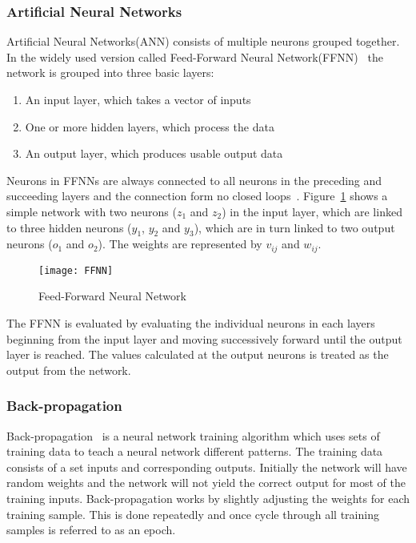 \subsubsection{Artificial Neural Networks}
Artificial Neural Networks(ANN) consists of multiple neurons grouped together. In the widely used version called Feed-Forward Neural Network(FFNN)~\cite{montana1989training} the network is grouped into three basic layers:
\begin{enumerate}
  \item An input layer, which takes a vector of inputs
  \item One or more hidden layers, which process the data
  \item An output layer, which produces usable output data
\end{enumerate}
Neurons in FFNNs are always connected to all neurons in the preceding and succeeding layers and the connection form no closed loops~\cite{yao1999evolving}. Figure~\ref{figure:FFNN} shows a simple network with two neurons ($z_1$ and $z_2$) in the input layer, which are linked to three hidden neurons ($y_1$, $y_2$ and $y_3$), which are in turn linked to two output neurons ($o_1$ and $o_2$). The weights are represented by $v_{ij}$ and $w_{ij}$.

\begin{figure}[H]
  \centering
    \texttt{[image: FFNN]}
    \caption{Feed-Forward Neural Network}
    \label{figure:FFNN}
\end{figure}

The FFNN is evaluated by evaluating the individual neurons in each layers beginning from the input layer and moving successively forward until the output layer is reached. The values calculated at the output neurons is treated as the output from the network.

\subsubsection{Back-propagation}

Back-propagation~\cite{koehn1994combining} is a neural network training algorithm which uses sets of training data to teach a neural network different patterns. The training data consists of a set inputs and corresponding outputs. Initially the network will have random weights and the network will not yield the correct output for most of the training inputs. Back-propagation works by slightly adjusting the weights for each training sample. This is done repeatedly and once cycle through all training samples is referred to as an epoch.

